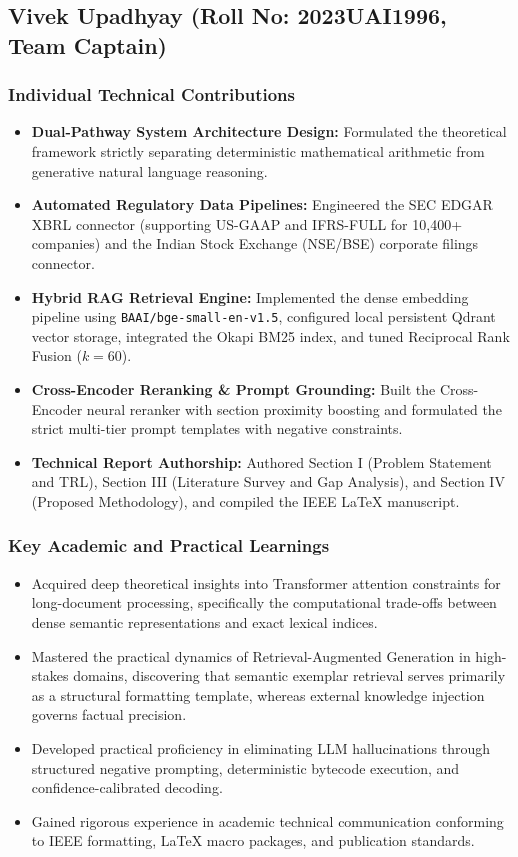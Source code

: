 \documentclass[conference]{IEEEtran}
\begin{document}
\subsection{Vivek Upadhyay (Roll No: 2023UAI1996, Team Captain)}

\subsubsection{Individual Technical Contributions}
\begin{itemize}
    \item \textbf{Dual-Pathway System Architecture Design:} Formulated the theoretical framework strictly separating deterministic mathematical arithmetic from generative natural language reasoning.
    \item \textbf{Automated Regulatory Data Pipelines:} Engineered the SEC EDGAR XBRL connector (supporting US-GAAP and IFRS-FULL for 10,400+ companies) and the Indian Stock Exchange (NSE/BSE) corporate filings connector.
    \item \textbf{Hybrid RAG Retrieval Engine:} Implemented the dense embedding pipeline using \texttt{BAAI/bge-small-en-v1.5}, configured local persistent Qdrant vector storage, integrated the Okapi BM25 index, and tuned Reciprocal Rank Fusion ($k=60$).
    \item \textbf{Cross-Encoder Reranking \& Prompt Grounding:} Built the Cross-Encoder neural reranker with section proximity boosting and formulated the strict multi-tier prompt templates with negative constraints.
    \item \textbf{Technical Report Authorship:} Authored Section I (Problem Statement and TRL), Section III (Literature Survey and Gap Analysis), and Section IV (Proposed Methodology), and compiled the IEEE LaTeX manuscript.
\end{itemize}

\subsubsection{Key Academic and Practical Learnings}
\begin{itemize}
    \item Acquired deep theoretical insights into Transformer attention constraints for long-document processing, specifically the computational trade-offs between dense semantic representations and exact lexical indices.
    \item Mastered the practical dynamics of Retrieval-Augmented Generation in high-stakes domains, discovering that semantic exemplar retrieval serves primarily as a structural formatting template, whereas external knowledge injection governs factual precision.
    \item Developed practical proficiency in eliminating LLM hallucinations through structured negative prompting, deterministic bytecode execution, and confidence-calibrated decoding.
    \item Gained rigorous experience in academic technical communication conforming to IEEE formatting, LaTeX macro packages, and publication standards.
\end{itemize}
\end{document}
